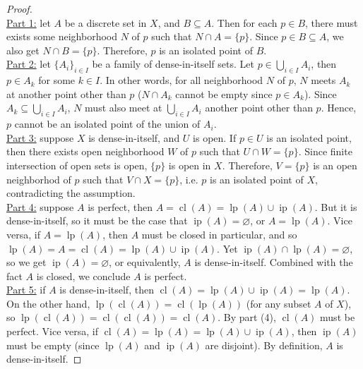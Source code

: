 \documentclass{treatise}
\begin{document}
\begin{proof} \ \\
\underline{Part 1:} let $A$ be a discrete set in $X$, and $B \subseteq A$. Then for each $p \in B$, there must exists some neighborhood $N$ of $p$ such that $N \cap A = \{ p \}$. Since $p \in B \subseteq A$, we also get $N \cap B = \{ p \}$. Therefore, $p$ is an isolated point of $B$.
\\
\underline{Part 2:} let $\{ A_i \}_{i \in I}$ be a family of dense-in-itself sets. Let $p \in \bigcup_{i \in I} A_i$, then $p \in A_k$ for some $k \in I$. In other words, for all neighborhood $N$ of $p$, $N$ meets $A_k$ at another point other than $p$ ($N \cap A_k$ cannot be empty since $p \in A_k$). Since $A_k \subseteq \bigcup_{i \in I} A_i$, $N$ must also meet at $\bigcup_{i \in I} A_i$ another point other than $p$. Hence, $p$ cannot be an isolated point of the union of $A_i$.
\\
\underline{Part 3:} suppose $X$ is dense-in-itself, and $U$ is open. If $p \in U$ is an isolated point, then there exists open neighborhood $W$ of $p$ such that $U \cap W = \{ p \}$. Since finite intersection of open sets is open, $\{ p \}$ is open in $X$. Therefore, $V = \{ p \}$ is an open neighborhod of $p$ such that $V \cap X = \{ p \}$, i.e. $p$ is an isolated point of $X$, contradicting the assumption.
\\
\underline{Part 4:} suppose $A$ is perfect, then $A = \operatorname{cl}(A) = \operatorname{lp}(A) \cup \operatorname{ip}(A)$. But it is dense-in-itself, so it must be the case that $\operatorname{ip}(A) = \varnothing$, or $A = \operatorname{lp}(A)$. Vice versa, if $A = \operatorname{lp}(A)$, then $A$ must be closed in particular, and so $\operatorname{lp}(A) = A = \operatorname{cl}(A) = \operatorname{lp}(A) \cup \operatorname{ip}(A)$. Yet $\operatorname{ip}(A) \cap \operatorname{lp}(A) = \varnothing$, so we get $\operatorname{ip}(A) = \varnothing$, or equivalently, $A$ is dense-in-itself. Combined with the fact $A$ is closed, we conclude $A$ is perfect.
\\
\underline{Part 5:} if $A$ is dense-in-itself, then $\operatorname{cl}(A) = \operatorname{lp}(A) \cup \operatorname{ip}(A) = \operatorname{lp}(A)$. On the other hand, $\operatorname{lp}(\operatorname{cl}(A)) = \operatorname{cl}(\operatorname{lp}(A))$ (for any subset $A$ of $X$), so $\operatorname{lp}(\operatorname{cl}(A)) = \operatorname{cl}(\operatorname{cl}(A)) = \operatorname{cl}(A)$. By part (4), $\operatorname{cl}(A)$ must be perfect. Vice versa, if $\operatorname{cl}(A) = \operatorname{lp}(A) = \operatorname{lp}(A) \cup \operatorname{ip}(A)$, then $\operatorname{ip}(A)$ must be empty (since $\operatorname{lp}(A)$ and $\operatorname{ip}(A)$ are disjoint). By definition, $A$ is dense-in-itself.
\end{proof}
\end{document}
